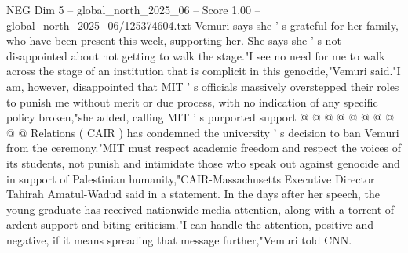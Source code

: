 \begin{textsample}{NEG Dim 5 – global\_north\_2025\_06 – Score 1.00 – global\_north\_2025\_06/125374604.txt}
Vemuri says she ' s grateful for her family, who have been present this week, supporting her.
She says she ' s not disappointed about not getting to walk the stage."I see no need for me to walk across the stage of an institution that is complicit in this genocide,"Vemuri said."I am, however, disappointed that MIT ' s officials massively overstepped their roles to punish me without merit or due process, with no indication of any specific policy broken,"she added, calling MIT ' s purported support @ @ @ @ @ @ @ @ @ @ Relations ( CAIR ) has condemned the university ' s decision to ban Vemuri from the ceremony."MIT must respect academic freedom and respect the voices of its students, not punish and intimidate those who speak out against genocide and in support of Palestinian humanity,"CAIR-Massachusetts Executive Director Tahirah Amatul-Wadud said in a statement.
In the days after her speech, the young graduate has received nationwide media attention, along with a torrent of ardent support and biting criticism."I can handle the attention, positive and negative, if it means spreading that message further,"Vemuri told CNN.

\end{textsample}
